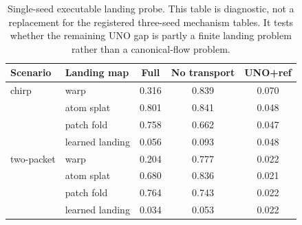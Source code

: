 \begin{table}[t]
\centering
\caption{Single-seed executable landing probe.  This table is diagnostic, not a replacement for the registered three-seed mechanism tables.  It tests whether the remaining UNO gap is partly a finite landing problem rather than a canonical-flow problem.}
\label{tab:synthesis-mode-probe}
\small
\begin{tabular}{p{}p{}ccc}
\toprule
Scenario & Landing map & Full & No transport & UNO+ref \\
\midrule
chirp & warp & 0.316 & 0.839 & 0.070 \\
 & atom splat & 0.801 & 0.841 & 0.048 \\
 & patch fold & 0.758 & 0.662 & 0.047 \\
 & learned landing & 0.056 & 0.093 & 0.048 \\
\addlinespace
two-packet & warp & 0.204 & 0.777 & 0.022 \\
 & atom splat & 0.680 & 0.836 & 0.021 \\
 & patch fold & 0.764 & 0.743 & 0.022 \\
 & learned landing & 0.034 & 0.053 & 0.022 \\
\bottomrule
\end{tabular}
\end{table}
